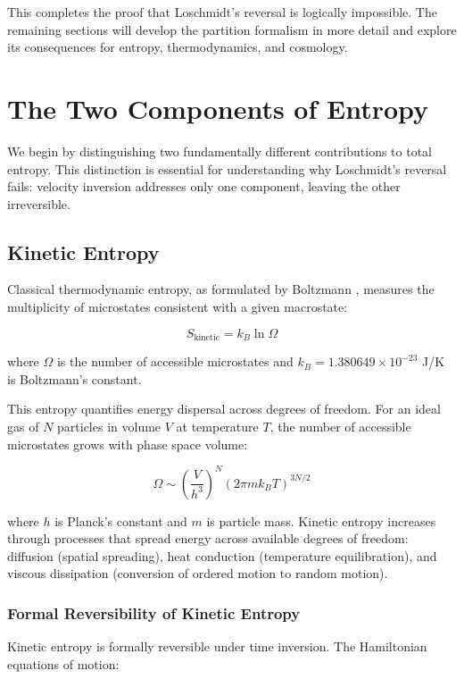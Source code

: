 \documentclass[twocolumn,10pt]{article}
\theoremstyle{definition}
\theoremstyle{remark}
\begin{document}
\vspace{0.2cm}
\noindent This completes the proof that Loschmidt's reversal is logically impossible. The remaining sections will develop the partition formalism in more detail and explore its consequences for entropy, thermodynamics, and cosmology.

\section{The Two Components of Entropy}
\label{sec:two_entropies}

We begin by distinguishing two fundamentally different contributions to total entropy. This distinction is essential for understanding why Loschmidt's reversal fails: velocity inversion addresses only one component, leaving the other irreversible.

\subsection{Kinetic Entropy}

Classical thermodynamic entropy, as formulated by Boltzmann \cite{boltzmann1877}, measures the multiplicity of microstates consistent with a given macrostate:

$$
S_{\text{kinetic}} = k_B \ln \Omega
$$

where $\Omega$ is the number of accessible microstates and $k_B = 1.380649 \times 10^{-23}$ J/K is Boltzmann's constant.

This entropy quantifies energy dispersal across degrees of freedom. For an ideal gas of $N$ particles in volume $V$ at temperature $T$, the number of accessible microstates grows with phase space volume:

$$
\Omega \sim \left(\frac{V}{h^3}\right)^N (2\pi m k_B T)^{3N/2}
$$

where $h$ is Planck's constant and $m$ is particle mass. Kinetic entropy increases through processes that spread energy across available degrees of freedom: diffusion (spatial spreading), heat conduction (temperature equilibration), and viscous dissipation (conversion of ordered motion to random motion).

\subsubsection{Formal Reversibility of Kinetic Entropy}

Kinetic entropy is formally reversible under time inversion. The Hamiltonian equations of motion:
\end{document}
